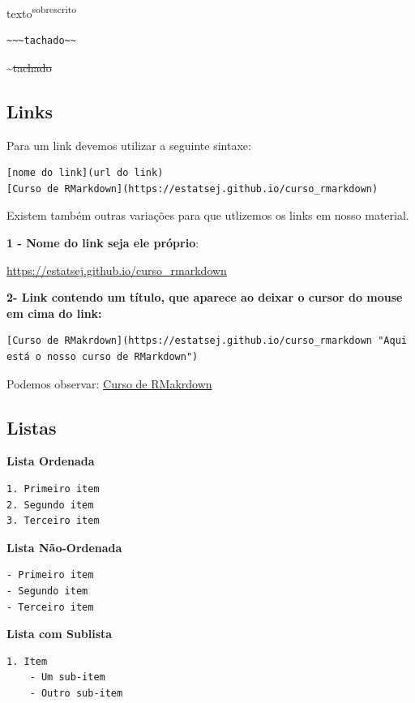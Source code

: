 \documentclass[
]{book}
\begin{document}
texto\textsuperscript{sobrescrito}

\begin{verbatim}
~~~tachado~~
\end{verbatim}

\textasciitilde{}\sout{tachado}

\hypertarget{links}{%
\subsection{Links}\label{links}}

Para um link devemos utilizar a seguinte sintaxe:

\begin{verbatim}
[nome do link](url do link)
[Curso de RMarkdown](https://estatsej.github.io/curso_rmarkdown)
\end{verbatim}

Existem também outras variações para que utlizemos os links em nosso material.

\textbf{1 - Nome do link seja ele próprio}:

\url{https://estatsej.github.io/curso_rmarkdown}

\textbf{2- Link contendo um título, que aparece ao deixar o cursor do mouse em cima do link:}

\begin{verbatim}
[Curso de RMakrdown](https://estatsej.github.io/curso_rmarkdown "Aqui está o nosso curso de RMarkdown")
\end{verbatim}

Podemos observar:
\href{https://estatsej.github.io/curso_rmarkdown}{Curso de RMakrdown}

\hypertarget{listas}{%
\subsection{Listas}\label{listas}}

\textbf{Lista Ordenada}

\begin{verbatim}
1. Primeiro item
2. Segundo item
3. Terceiro item
\end{verbatim}

\textbf{Lista Não-Ordenada}

\begin{verbatim}
- Primeiro item
- Segundo item
- Terceiro item
\end{verbatim}

\textbf{Lista com Sublista}

\begin{verbatim}
1. Item
    - Um sub-item
    - Outro sub-item
\end{verbatim}
\end{document}
